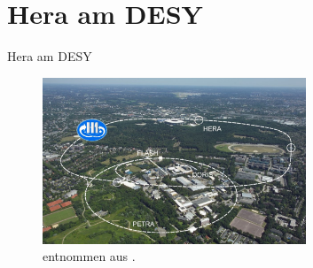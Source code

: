 \documentclass[aspectratio=1610, 9pt]{beamer}
\begin{document}
\section{Hera am DESY}

\begin{frame}{Hera am DESY}
  \begin{figure}
    \centering
    \includegraphics[width=0.7\textwidth]{images/DESY.jpg}
    \caption{entnommen aus \cite{DESY-H1}.}
  \end{figure}
\end{frame}
\end{document}
